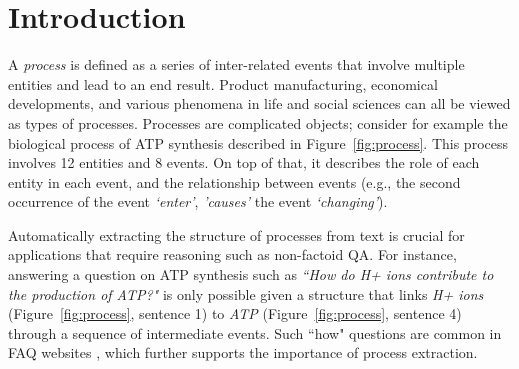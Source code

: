 \section{Introduction}

A \emph{process} is defined as a series of inter-related events that involve multiple entities and lead to an end result. Product manufacturing, economical developments, and various phenomena in life and social sciences can all be viewed as types of processes. Processes are complicated objects; consider for example the biological process of ATP synthesis described in Figure~\ref{fig:process}. This process involves 12 entities and 8 events. On top of that, it describes the role of each entity in each event, and the relationship between events (e.g., the second occurrence of the event \textit{`enter'}, \textit{'causes'} the event \textit{`changing'}). 


Automatically extracting the structure of processes from text is crucial for applications that require reasoning such as non-factoid QA. For instance, answering a question on ATP synthesis such as \emph{``How do H+ ions contribute to the production of ATP?"} is only possible given a structure that links \emph{H+ ions} (Figure~\ref{fig:process}, sentence 1) to \emph{ATP} (Figure~\ref{fig:process}, sentence 4) through a sequence of intermediate events. Such ``how" questions are common in FAQ websites \cite{Surdeanu:2011}, which further supports the importance of process extraction.



